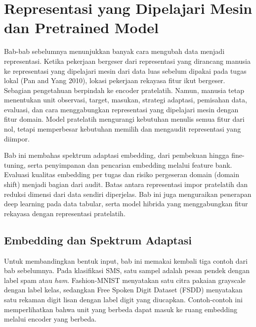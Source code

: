 \chapter{Representasi yang Dipelajari Mesin dan Pretrained Model}\label{representasi-yang-dipelajari-mesin-dan-pretrained-model}

Bab-bab sebelumnya menunjukkan banyak cara mengubah data menjadi representasi. Ketika pekerjaan bergeser dari representasi yang dirancang manusia ke representasi yang dipelajari mesin dari data luas sebelum dipakai pada tugas lokal (Pan and Yang 2010), lokasi pekerjaan rekayasa fitur ikut bergeser. Sebagian pengetahuan berpindah ke encoder pratelatih. Namun, manusia tetap menentukan unit observasi, target, masukan, strategi adaptasi, pemisahan data, evaluasi, dan cara menggabungkan representasi yang dipelajari mesin dengan fitur domain. Model pratelatih mengurangi kebutuhan menulis semua fitur dari nol, tetapi memperbesar kebutuhan memilih dan mengaudit representasi yang diimpor.

Bab ini membahas spektrum adaptasi embedding, dari pembekuan hingga fine-tuning, serta penyimpanan dan pencarian embedding melalui feature bank. Evaluasi kualitas embedding per tugas dan risiko pergeseran domain (domain shift) menjadi bagian dari audit. Batas antara representasi impor pratelatih dan reduksi dimensi dari data sendiri diperjelas. Bab ini juga menguraikan penerapan deep learning pada data tabular, serta model hibrida yang menggabungkan fitur rekayasa dengan representasi pratelatih.

\section{Embedding dan Spektrum Adaptasi}\label{embedding-dan-spektrum-adaptasi}

Untuk membandingkan bentuk input, bab ini memakai kembali tiga contoh dari bab sebelumnya. Pada klasifikasi SMS, satu sampel adalah pesan pendek dengan label spam atau \emph{ham}. Fashion-MNIST menyatakan satu citra pakaian grayscale dengan label kelas, sedangkan Free Spoken Digit Dataset (FSDD) menyatakan satu rekaman digit lisan dengan label digit yang diucapkan. Contoh-contoh ini memperlihatkan bahwa unit yang berbeda dapat masuk ke ruang embedding melalui encoder yang berbeda.

